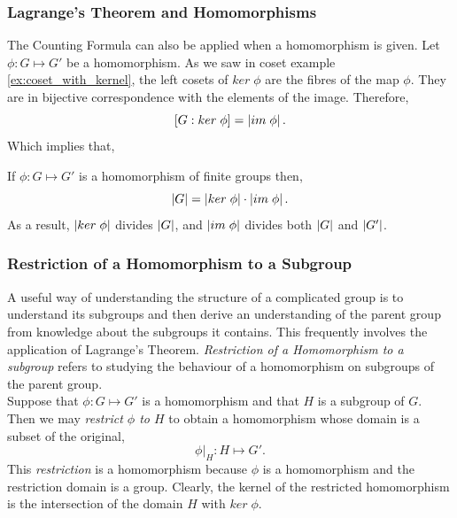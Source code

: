 \documentclass[MathsNotesBase.tex]{subfiles}
\begin{document}
{		\subsubsection{Lagrange's Theorem and Homomorphisms}
		The Counting Formula can also be applied when a homomorphism is given. Let $\phi : G \longmapsto G'$ be a homomorphism. As we saw in coset example \ref{ex:coset_with_kernel}, the left cosets of $ker \; \phi$ are the fibres of the map $\phi$. They are in bijective correspondence with the elements of the image. Therefore,
		\[ [G : ker \; \phi] = \left\lvert im \; \phi\right\rvert. \]
		Which implies that,
		\begin{corollary}
			\label{coro:order_of_image_divides_both_order_of_domain_and_codomain}
			If $\phi : G \longmapsto G'$ is a homomorphism of finite groups then,
			\[ \left\lvert G\right\rvert = \left\lvert ker \; \phi\right\rvert \cdot \left\lvert im \; \phi\right\rvert. \]
			As a result, $\left\lvert ker \; \phi\right\rvert$ divides $\left\lvert G\right\rvert$, and $\left\lvert im \; \phi\right\rvert$ divides both $\left\lvert G\right\rvert$ and $\left\lvert G'\right\rvert$.
		\end{corollary}
	
		\bigskip
		\subsubsection{Restriction of a Homomorphism to a Subgroup}
		A useful way of understanding the structure of a complicated group is to understand its subgroups and then derive an understanding of the parent group from knowledge about the subgroups it contains. This frequently involves the application of Lagrange's Theorem. \textit{Restriction of a Homomorphism to a subgroup} refers to studying the behaviour of a homomorphism on subgroups of the parent group.\\
		Suppose that ${ \phi: G \longmapsto G' }$ is a homomorphism and that $H$ is a subgroup of $G$. Then we may \textit{restrict $\phi$ to $H$} to obtain a homomorphism whose domain is a subset of the original,
		\[ \phi \vert_H : H \longmapsto G'. \]
		This \textit{restriction} is a homomorphism because $\phi$ is a homomorphism and the restriction domain is a group. Clearly, the kernel of the restricted homomorphism is the intersection of the domain $H$ with ${ ker\;\phi }$.
		
		\smallskip
}
\end{document}
